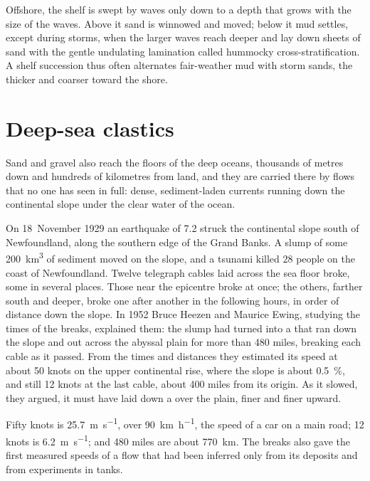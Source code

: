 Offshore, the shelf is swept by waves only down to a depth that grows with the
size of the waves. Above it sand is winnowed and moved; below it mud settles,
except during storms, when the larger waves reach deeper and lay down sheets of
sand with the gentle undulating lamination called hummocky cross-stratification.
A shelf succession thus often alternates fair-weather mud with storm sands, the
thicker and coarser toward the shore.

\section{Deep-sea clastics}\label{sec:b1:clastic-sediments:deep-sea}

Sand and gravel also reach the floors of the deep oceans, thousands of metres
down and hundreds of kilometres from land, and they are carried there by flows
that no one has seen in full: dense, sediment-laden currents running down the
continental slope under the clear water of the ocean.

\begin{history}
On 18~November 1929 an earthquake of  7.2 struck the continental
slope south of Newfoundland, along the southern edge of the Grand Banks. A slump
of some \qty{200}{km^3} of sediment moved on the slope, and a tsunami killed 28
people on the coast of Newfoundland. Twelve telegraph cables laid across the
sea floor broke, some in several places. Those near the epicentre broke at once;
the others, farther south and deeper, broke one after another in the following
hours, in order of distance down the slope. In 1952 Bruce Heezen and Maurice Ewing,
studying the times of the breaks, explained them: the slump had turned into a
 that ran down the slope and out across the abyssal plain for
more than 480 miles, breaking each cable as it passed. From the times and
distances they estimated its speed at about 50 knots on the upper continental
rise, where the slope is about \qty{0.5}{\percent}, and still 12 knots at the
last cable, about 400 miles from its origin. As it slowed, they argued, it must
have laid down a  over the plain, finer and finer upward.
\end{history}

Fifty knots is \qty{25.7}{m.s^{-1}}, over \qty{90}{km.h^{-1}}, the speed of a
car on a main road; 12 knots is \qty{6.2}{m.s^{-1}}; and 480 miles are about
\qty{770}{km}. The breaks also gave the first measured speeds of a flow that
had been inferred only from its deposits and from experiments in tanks.


